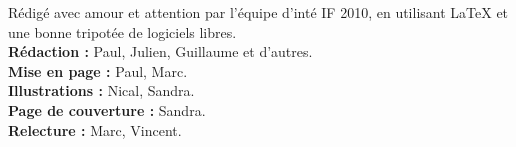 





\tableofcontents
\vspace{1cm}
\begin{multicols}{2}
{
    \begin{center}
\footnotesize
Rédigé avec amour et attention par l'équipe d'inté IF 2010, en utilisant
\LaTeX{} et une bonne tripotée de logiciels libres. \\
\textbf{Rédaction : }Paul, Julien, Guillaume et d'autres.\\
\textbf{Mise en page : }Paul, Marc.\\
\textbf{Illustrations :} Nical, Sandra.\\
\textbf{Page de couverture :} Sandra.\\
\textbf{Relecture :} Marc, Vincent.\\
\normalsize
\cc \ccby \ccnc \ccsa
\end{center}
}
\end{multicols}

